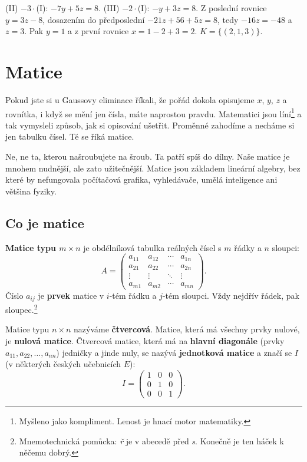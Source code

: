 \begin{solution}
  (II) $- 3\cdot$(I): $-7y + 5z = 8$. (III) $- 2\cdot$(I): $-y + 3z = 8$. Z poslední rovnice $y = 3z - 8$, dosazením do předposlední $-21z + 56 + 5z = 8$, tedy $-16z = -48$ a $z = 3$. Pak $y = 1$ a z první rovnice $x = 1 - 2 + 3 = 2$. $K = \{(2, 1, 3)\}$.
\end{solution}

\section{Matice}

Pokud jste si u Gaussovy eliminace říkali, že pořád dokola opisujeme $x$, $y$, $z$ a rovnítka, i když se mění jen čísla, máte naprostou pravdu. Matematici jsou líní\footnote{Myšleno jako kompliment. Lenost je hnací motor matematiky.} a tak vymysleli způsob, jak si opisování ušetřit. Proměnné zahodíme a necháme si jen tabulku čísel. Té se říká matice.

Ne, ne ta, kterou našroubujete na šroub. Ta patří spíš do dílny. Naše matice je mnohem nudnější, ale zato užitečnější. Matice jsou základem lineární algebry, bez které by nefungovala počítačová grafika, vyhledávače, umělá inteligence ani většina fyziky.

\subsection{Co je matice}

\begin{definitionbox}
  \textbf{Matice typu $m\times n$} je obdélníková tabulka reálných čísel s $m$ řádky a $n$ sloupci:
  \begin{equation*}
    A = \begin{pmatrix}
      a_{11} & a_{12} & \cdots & a_{1n}\\
      a_{21} & a_{22} & \cdots & a_{2n}\\
      \vdots & \vdots & \ddots & \vdots\\
      a_{m1} & a_{m2} & \cdots & a_{mn}
    \end{pmatrix}.
  \end{equation*}
  Číslo $a_{ij}$ je \textbf{prvek} matice v $i$-tém řádku a $j$-tém sloupci. Vždy nejdřív řádek, pak sloupec.\footnote{Mnemotechnická pomůcka: \textit{ř} je v abecedě před \textit{s}. Konečně je ten háček k něčemu dobrý.}

  \vspace{0.2cm}

  Matice typu $n\times n$ nazýváme \textbf{čtvercová}. Matice, která má všechny prvky nulové, je \textbf{nulová matice}. Čtvercová matice, která má na \textbf{hlavní diagonále} (prvky $a_{11}, a_{22}, \ldots, a_{nn}$) jedničky a jinde nuly, se nazývá \textbf{jednotková matice} a značí se $I$ (v některých českých učebnicích $E$):
  \begin{equation*}
    I = \begin{pmatrix} 1 & 0 & 0\\ 0 & 1 & 0\\ 0 & 0 & 1 \end{pmatrix}.
  \end{equation*}
\end{definitionbox}

